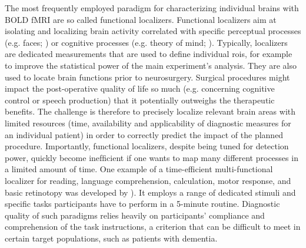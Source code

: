 %
The most frequently employed paradigm for characterizing individual brains with
BOLD fMRI are so called functional localizers.
%
Functional localizers aim at isolating and localizing brain activity correlated
with specific perceptual processes (e.g. faces; \citep{kanwisher1997ffa}) or
cognitive processes (e.g. theory of mind; \citep{spunt2014validating}).
%
Typically, localizers are dedicated measurements that are used to define
individual \acp{roi}, for example to improve the statistical power of the main
experiment's analysis.
They are also used to locate brain functions prior to neurosurgery.
%
Surgical procedures might impact the post-operative quality of life so much
(e.g. concerning cognitive control or speech production) that it potentially
outweighs the therapeutic benefits.
%
The challenge is therefore to precisely localize relevant brain areas with
limited resources (time, availability and applicability of diagnostic measures
for an individual patient) in order to correctly predict the impact of the
planned procedure.
%
Importantly, functional localizers, despite being tuned for detection power,
quickly become inefﬁcient if one wants to map many different processes in a
limited amount of time.
%
One example of a time-efficient multi-functional localizer for reading, language
comprehension, calculation, motor response, and basic retinotopy was developed
by \citep{pinel2007fast}).
%
It employs a range of dedicated stimuli and specific tasks participants have to
perform in a 5-minute routine.
%
Diagnostic quality of such paradigms relies heavily on participants' compliance
and comprehension of the task instructions, a criterion that can be difficult to
meet in certain target populations, such as patients with dementia.


